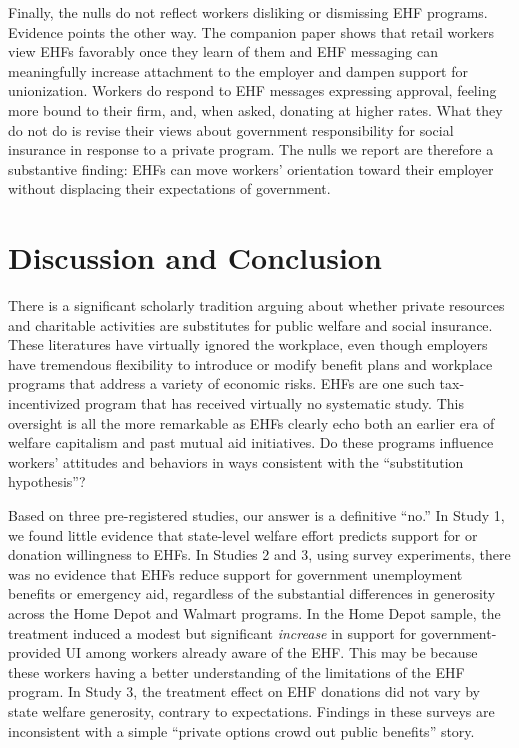 \documentclass[
  11pt,
  oneside]{article}
\begin{document}
Finally, the nulls do not reflect workers disliking or dismissing EHF programs. Evidence points the other way. The companion paper shows that retail workers view EHFs favorably once they learn of them and EHF messaging can meaningfully increase attachment to the employer and dampen support for unionization. Workers do respond to EHF messages expressing approval, feeling more bound to their firm, and, when asked, donating at higher rates. What they do not do is revise their views about government responsibility for social insurance in response to a private program. The nulls we report are therefore a substantive finding: EHFs can move workers' orientation toward their employer without displacing their expectations of government.

\section{Discussion and Conclusion}\label{sec-conclusion}

There is a significant scholarly tradition arguing about whether private resources and charitable activities are substitutes for public welfare and social insurance. These literatures have virtually ignored the workplace, even though employers have tremendous flexibility to introduce or modify benefit plans and workplace programs that address a variety of economic risks. EHFs are one such tax-incentivized program that has received virtually no systematic study. This oversight is all the more remarkable as EHFs clearly echo both an earlier era of welfare capitalism and past mutual aid initiatives. Do these programs influence workers' attitudes and behaviors in ways consistent with the ``substitution hypothesis''?

Based on three pre-registered studies, our answer is a definitive ``no.'' In Study 1, we found little evidence that state-level welfare effort predicts support for or donation willingness to EHFs. In Studies 2 and 3, using survey experiments, there was no evidence that EHFs reduce support for government unemployment benefits or emergency aid, regardless of the substantial differences in generosity across the Home Depot and Walmart programs. In the Home Depot sample, the treatment induced a modest but significant \emph{increase} in support for government-provided UI among workers already aware of the EHF. This may be because these workers having a better understanding of the limitations of the EHF program. In Study 3, the treatment effect on EHF donations did not vary by state welfare generosity, contrary to expectations. Findings in these surveys are inconsistent with a simple ``private options crowd out public benefits'' story.
\end{document}
